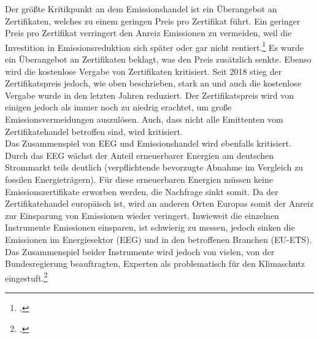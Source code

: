 Der größte Kritikpunkt an dem Emissionshandel ist ein Überangebot an Zertifikaten, welches zu einem geringen Preis pro Zertifikat führt.
Ein geringer Preis pro Zertifikat verringert den Anreiz Emissionen zu vermeiden, weil die Investition in Emissionsreduktion sich später oder gar nicht rentiert.\footcite[Vgl. auch im Folgenden][]{Matthes2017}
Es wurde ein Überangebot an Zertifikaten beklagt, was den Preis zusätzlich senkte.
Ebenso wird die kostenlose Vergabe von Zertifikaten kritisiert.
Seit 2018 stieg der Zertifikatspreis jedoch, wie oben beschrieben, stark an und auch die kostenlose Vergabe wurde in den letzten Jahren reduziert.
Der Zertifikatspreis wird von einigen jedoch als immer noch zu niedrig erachtet, um große Emissionsvermeidungen auszulösen.
Auch, dass nicht alle Emittenten vom Zertifikatehandel betroffen sind, wird kritisiert.\\
Das Zusammenspiel von EEG und Emissionshandel wird ebenfalls kritisiert.
Durch das EEG wächst der Anteil erneuerbarer Energien am deutschen Strommarkt teils deutlich (verpflichtende bevorzugte Abnahme im Vergleich zu fossilen Energieträgern).
Für diese erneuerbaren Energien müssen keine Emissionszertifikate erworben werden, die Nachfrage sinkt somit.
Da der Zertifikatehandel europäisch ist, wird an anderen Orten Europas somit der Anreiz zur Einsparung von Emissionen wieder veringert.
Inwieweit die einzelnen Instrumente Emissionen einsparen, ist schwierig zu messen, jedoch sinken die Emissionen im Energiesektor (EEG) und in den betroffenen Branchen (EU-ETS). Das Zusammenspiel beider Instrumente wird jedoch von vielen, von der Bundesregierung beauftragten, Experten als problematisch für den Klimaschutz eingestuft.\footcite[Vgl. u.a.][]{SachverstandigenratzurBegutachtungdergesamtwirtschaftlichenEntwicklung}
